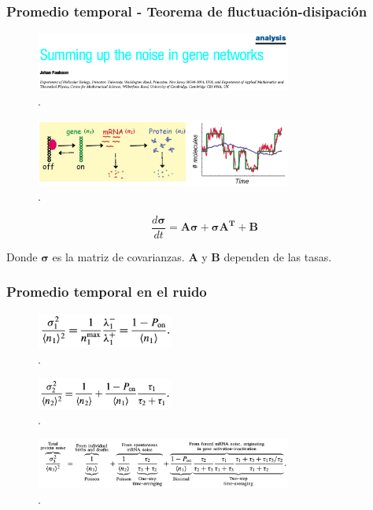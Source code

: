 \documentclass{beamer}
\begin{document}
\begin{frame}
\frametitle{Promedio temporal - Teorema de fluctuaci\'on-disipaci\'on}
\begin{figure}[p]
    \centering
    \includegraphics[width=0.75\textwidth]{paulsson04.png}\\
    \tiny \cite{paulsson04}.
\end{figure}

\begin{figure}[p]
    \centering
    \includegraphics[width=0.75\textwidth]{timeave.png}\\
    \tiny \cite{paulsson05}.
\end{figure}

$$\frac{d\pmb{\sigma}}{dt} = \pmb{A\sigma} + \pmb{\sigma A^T} + \pmb{B}$$

Donde $\pmb{\sigma}$ es la matriz de covarianzas. $\pmb{A}$ y $\pmb{B}$ dependen de las tasas.

\end{frame}

\begin{frame}
\frametitle{Promedio temporal en el ruido}

\begin{figure}[p]
    \centering
    \includegraphics[width=0.4\textwidth]{5d.png}\\
    \tiny \cite{paulsson05}.
\end{figure}

\begin{figure}[p]
    \centering
    \includegraphics[width=0.4\textwidth]{5r.png}\\
    \tiny \cite{paulsson05}.
\end{figure}

\begin{figure}[p]
    \centering
    \includegraphics[width=0.75\textwidth]{eqtave.png}\\
    \tiny \cite{paulsson05}.
\end{figure}
\end{frame}
\end{document}
